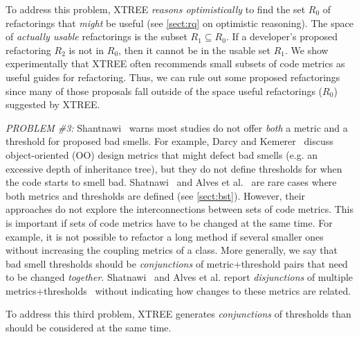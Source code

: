 \documentclass{sig-alternate}
\newcommand{\tion}[1]{\textsection\ref{sect:#1}}
\theoremstyle{break}
\begin{document}
To address this problem, XTREE {\em reasons optimistically} to find the set
$R_0$ of refactorings that \textit{might} be useful (see \tion{rq} on optimistic reasoning).
The space of \textit{actually usable} refactorings is 
the subset $R_1 \subseteq R_0$.
If a developer's proposed refactoring $R_2$ is
not in $R_0$, then it cannot be in the usable
set $R_1$.  We show experimentally that XTREE
often recommends small subsets of
code metrics as useful guides for refactoring. Thus, we
can rule out some proposed refactorings
since many of those proposals fall outside of the space
useful refactorings ($R_0$) suggested by XTREE.  



{\em PROBLEM \#3:}  
Shantnawi~\cite{Shatnawi10} warns most  studies do not offer
{\em both} a metric and a threshold for proposed bad smells. For example,  Darcy and Kemerer~\cite{darcy05}
discuss object-oriented (OO) design metrics that might defect bad smells (e.g. an excessive
depth of inheritance tree), but they do not define thresholds
for when the code starts to smell bad.  
Shatnawi~\cite{Shatnawi10}
and  Alves et al.~\cite{Alves2010} are rare cases where both metrics and thresholds are defined (see \tion{bst}).
However, their approaches do not explore the interconnections between sets of code metrics. This is important if sets of
code metrics have to be changed at the same time.
For example, it is not possible to refactor a
long method if several smaller ones without increasing
the coupling metrics of a class. 
More generally, we say that bad smell thresholds should be
{\em conjunctions} of metric+threshold pairs that need to be changed {\em together}.
Shatnawi~\cite{Shatnawi10}
and Alves et al. report {\em disjunctions} of multiple metrics+thresholds~\cite{Shatnawi10,Alves2010} without indicating how changes to these metrics are related.



To address this third problem, 
XTREE   generates {\em conjunctions} of   thresholds
than should  be considered at the same time.
\end{document}
